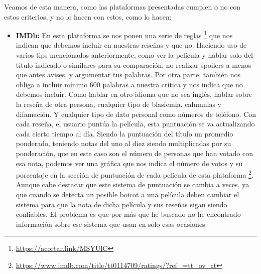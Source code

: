 Veamos de esta manera, como las plataformas presentadas cumplen o no con estos criterios, y no lo hacen con estos, como lo hacen:

\begin{itemize}
\item \textbf{IMDb:} En esta plataforma se nos ponen una serie de reglas \footnote{\url{https://acortar.link/MSYUlC}} que nos indican que debemos incluir en nuestras reseñas y que no. Haciendo uso de varios tips mencionados anteriormente, como ver la película y hablar solo del título indicado o similares para su comparación, no realizar spoilers a menos que antes avises, y argumentar tus palabras. Por otra parte, también nos obliga a incluir mínimo 600 palabras a nuestra crítica y nos indica que no debemos incluir. Como hablar en otro idioma que no sea inglés, hablar sobre la reseña de otra persona, cualquier tipo de blasfemia, calumnias y difamación. Y cualquier tipo de dato personal como números de teléfono. Con cada reseña, el usuario puntúa la película, esta puntuación se va actualizando cada cierto tiempo al día. Siendo la puntuación del título un promedio ponderado, teniendo notas del uno al diez siendo multiplicadas por su ponderación, que en este caso son el número de personas que han votado con esa nota, podemos ver una gráfica que nos indica el número de votos y su porcentaje en la sección de puntuación de cada película de esta plataforma \footnote{\url{https://www.imdb.com/title/tt0114709/ratings/?ref_=tt_ov_rt}}. Aunque cabe destacar que este sistema de puntuación se cambia a veces, ya que cuando se detecta un posible boicot a una película deben cambiar el sistema para que la nota de dicha película y sus reseñas sigan siendo confiables. El problema es que por más que he buscado no he encontrado información sobre ese sistema que usan en solo esas ocasiones.

\end{itemize}
